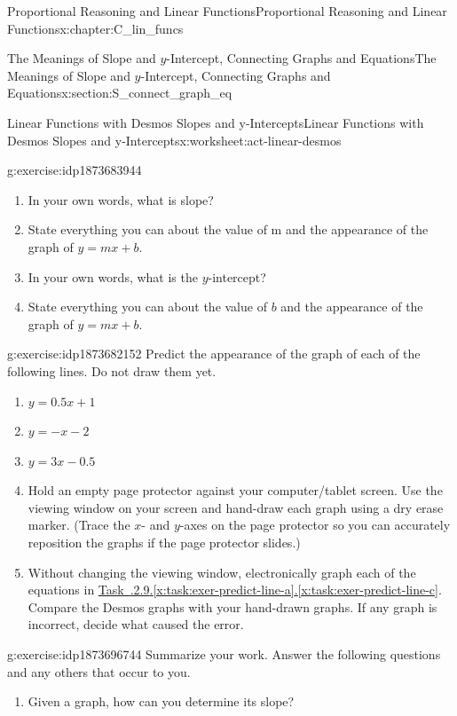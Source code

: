 \documentclass[oneside,10pt,]{book}
\newcommand{\xreffont}{\relax}
\numberwithin{equation}{chapter}
\begin{document}
\begin{chapterptx}{Proportional Reasoning and Linear Functions}{}{Proportional Reasoning and Linear Functions}{}{}{x:chapter:C_lin_funcs}
\begin{sectionptx}{The Meanings of Slope and \(y\)-Intercept, Connecting Graphs and Equations}{}{The Meanings of Slope and \(y\)-Intercept, Connecting Graphs and Equations}{}{}{x:section:S_connect_graph_eq}
\begin{worksheet-subsection}{Linear Functions with Desmos \textemdash{} Slopes and y-Intercepts}{}{Linear Functions with Desmos \textemdash{} Slopes and y-Intercepts}{}{}{x:worksheet:act-linear-desmos}
\begin{divisionexercise}{8}{}{}{g:exercise:idp1873683944}%
\begin{enumerate}[font=\bfseries,label=(\alph*),ref=\alph*]
\item{}In your own words, what is slope?%
\item{}State everything you can about the value of m and the appearance of the graph of \(y = mx + b\).%
\item{}In your own words, what is the \(y\)-intercept?%
\item{}State everything you can about the value of \(b\) and the appearance of the graph of \(y = mx + b\).%
\end{enumerate}
\end{divisionexercise}%
\begin{divisionexercise}{9}{}{}{g:exercise:idp1873682152}%
Predict the appearance of the graph of each of the following lines. Do not draw them yet.%
\begin{enumerate}[font=\bfseries,label=(\alph*),ref=\alph*]
\item\label{x:task:exer-predict-line-a}\(y = 0.5x + 1\)%
\item{}\(y = -x - 2\)%
\item\label{x:task:exer-predict-line-c}\(y = 3x - 0.5\)%
\item{}Hold an empty page protector against your computer\slash{}tablet screen. Use the viewing window on your screen and hand-draw each graph using a dry erase marker. (Trace the \(x\)- and \(y\)-axes on the page protector so you can accurately reposition the graphs if the page protector slides.)%
\item{}Without changing the viewing window, electronically graph each of the equations in \hyperref[x:task:exer-predict-line-a]{Task~{\xreffont 2.7.2.9}.{\xreffont\ref{x:task:exer-predict-line-a}}\textendash{}{\xreffont 2.7.2.9}.{\xreffont\ref{x:task:exer-predict-line-c}}}. Compare the Desmos graphs with your hand-drawn graphs. If any graph is incorrect, decide what caused the error.%
\end{enumerate}
\end{divisionexercise}%
\begin{divisionexercise}{10}{}{}{g:exercise:idp1873696744}%
Summarize your work. Answer the following questions and any others that occur to you.%
\begin{enumerate}[font=\bfseries,label=(\alph*),ref=\alph*]
\item{}Given a graph, how can you determine its slope?%

\end{enumerate}
\end{divisionexercise}
\end{worksheet-subsection}
\end{sectionptx}
\end{chapterptx}
\end{document}
